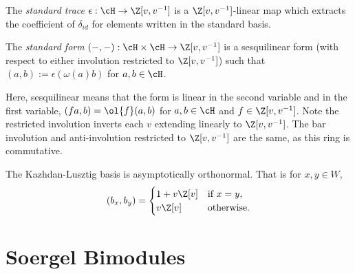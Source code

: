 \begin{definition}
    The \textit{standard trace} $\epsilon: \cH \to \Z[v,v^{-1}]$ is a $\Z[v,v^{-1}]$-linear map which extracts the coefficient of $\delta_{id}$ for elements written in the standard basis.
\end{definition}

\begin{definition}
    The \textit{standard form} $(-,-): \cH\times\cH \to \Z[v,v^{-1}]$ is a sesquilinear form (with respect to either involution restricted to $\Z[v,v^{-1}]$) such that $(a,b) := \epsilon(\omega(a)b)$ for $a,b \in \cH$.
\end{definition}
Here, sesquilinear means that the form is linear in the second variable and in the first variable, $(fa,b) = \ol{f} (a,b)$ for $a,b \in \cH$ and $f \in \Z[v,v^{-1}]$. Note the restricted involution inverts each $v$ extending linearly to $\Z[v,v^{-1}]$. The bar involution and anti-involution restricted to $\Z[v,v^{-1}]$ are the same, as this ring is commutative.


\begin{theorem}
    The Kazhdan-Lusztig basis is asymptotically orthonormal. That is for $x,y \in W$,
    \[
        (b_x, b_y) =
        \begin{cases}
            1 + v\Z[v] & \text{if }x = y,  \\
            v\Z[v]     & \text{otherwise.}
        \end{cases}
    \]
\end{theorem}






\section{Soergel Bimodules}


